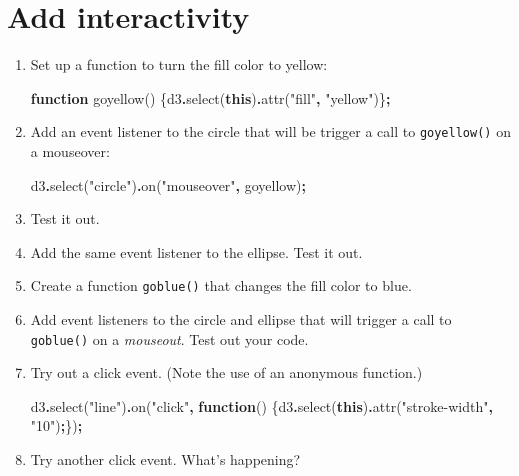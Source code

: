 \documentclass[
  openany]{book}
\newenvironment{Shaded}{\begin{snugshade}}{\end{snugshade}}
\newcommand{\FunctionTok}[1]{\textcolor[rgb]{0.00,0.00,0.00}{#1}}
\newcommand{\KeywordTok}[1]{\textcolor[rgb]{0.13,0.29,0.53}{\textbf{#1}}}
\newcommand{\NormalTok}[1]{#1}
\newcommand{\OperatorTok}[1]{\textcolor[rgb]{0.81,0.36,0.00}{\textbf{#1}}}
\newcommand{\StringTok}[1]{\textcolor[rgb]{0.31,0.60,0.02}{#1}}
\begin{document}
\hypertarget{add-interactivity}{%
\section{\texorpdfstring{Add interactivity }{Add interactivity }}\label{add-interactivity}}

\begin{enumerate}
\def\labelenumi{\arabic{enumi}.}
\item
  Set up a function to turn the fill color to yellow:

\begin{Shaded}
\begin{Highlighting}[]
\KeywordTok{function} \FunctionTok{goyellow}\NormalTok{() \{d3}\OperatorTok{.}\FunctionTok{select}\NormalTok{(}\KeywordTok{this}\NormalTok{)}\OperatorTok{.}\FunctionTok{attr}\NormalTok{(}\StringTok{"fill"}\OperatorTok{,} \StringTok{"yellow"}\NormalTok{)\}}\OperatorTok{;}
\end{Highlighting}
\end{Shaded}
\item
  Add an event listener to the circle that will be trigger a call to \texttt{goyellow()} on a mouseover:

\begin{Shaded}
\begin{Highlighting}[]
\NormalTok{d3}\OperatorTok{.}\FunctionTok{select}\NormalTok{(}\StringTok{"circle"}\NormalTok{)}\OperatorTok{.}\FunctionTok{on}\NormalTok{(}\StringTok{"mouseover"}\OperatorTok{,}\NormalTok{ goyellow)}\OperatorTok{;}
\end{Highlighting}
\end{Shaded}
\item
  Test it out.
\item
  Add the same event listener to the ellipse. Test it out.
\item
  Create a function \texttt{goblue()} that changes the fill color to blue.
\item
  Add event listeners to the circle and ellipse that will trigger a call to \texttt{goblue()} on a \emph{mouseout}. Test out your code.
\item
  Try out a click event. (Note the use of an anonymous function.)

\begin{Shaded}
\begin{Highlighting}[]
\NormalTok{d3}\OperatorTok{.}\FunctionTok{select}\NormalTok{(}\StringTok{"line"}\NormalTok{)}\OperatorTok{.}\FunctionTok{on}\NormalTok{(}\StringTok{"click"}\OperatorTok{,} \KeywordTok{function}\NormalTok{()}
\NormalTok{  \{d3}\OperatorTok{.}\FunctionTok{select}\NormalTok{(}\KeywordTok{this}\NormalTok{)}\OperatorTok{.}\FunctionTok{attr}\NormalTok{(}\StringTok{"stroke{-}width"}\OperatorTok{,} \StringTok{"10"}\NormalTok{)}\OperatorTok{;}\NormalTok{\})}\OperatorTok{;}
\end{Highlighting}
\end{Shaded}
\item
  Try another click event. What's happening?


\end{enumerate}
\end{document}
